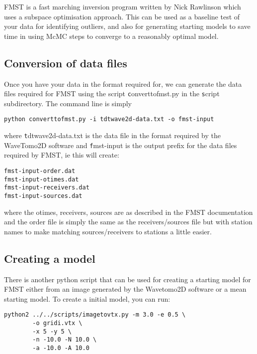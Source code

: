 \documentclass[a4paper,12pt]{article}
\begin{document}
FMST is a fast marching inversion program written by Nick Rawlinson
which uses a subspace optimisation approach. This can be used as a
baseline test of your data for identifying outliers, and also for
generating starting models to save time in using McMC steps to
converge to a reasonably optimal model.

\subsection{Conversion of data files}

Once you have your data in the format required for, we can generate
the data files required for FMST using the script {\texttt
  converttofmst.py} in the {\texttt script} subdirectory. The
command line is simply

\begin{verbatim}
python converttofmst.py -i tdtwave2d-data.txt -o fmst-input
\end{verbatim}

where {\texttt tdtwave2d-data.txt} is the data file in the format
required by the WaveTomo2D software and {\texttt fmst-input} is
the output prefix for the data files required by FMST, ie
this will create:

\begin{verbatim}
fmst-input-order.dat
fmst-input-otimes.dat
fmst-input-receivers.dat
fmst-input-sources.dat
\end{verbatim}

where the otimes, receivers, sources are as described in the
FMST documentation and the order file is simply the same as
the receivers/sources file but with station names to make matching
sources/receivers to stations a little easier.

\subsection{Creating a model}

There is another python script that can be used for creating a
starting model for FMST either from an image generated by the
Wavetomo2D software or a mean starting model. To create a
initial model, you can run:

\begin{verbatim}
python2 ../../scripts/imagetovtx.py -m 3.0 -e 0.5 \
        -o gridi.vtx \
        -x 5 -y 5 \
        -n -10.0 -N 10.0 \
        -a -10.0 -A 10.0
\end{verbatim}
\end{document}
